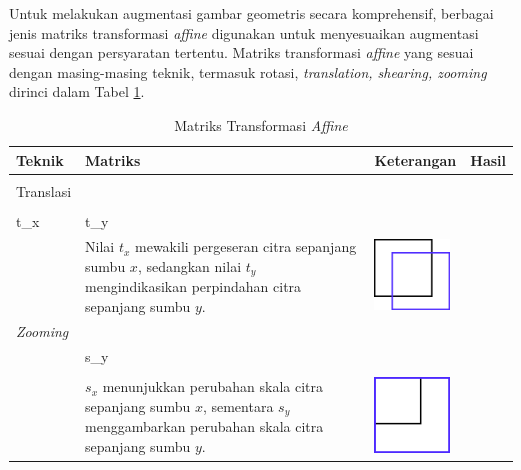    
        

        Untuk melakukan augmentasi gambar geometris secara komprehensif, berbagai jenis matriks transformasi \textit{affine} digunakan untuk menyesuaikan augmentasi sesuai dengan persyaratan tertentu. Matriks transformasi \textit{affine} yang sesuai dengan masing-masing teknik, termasuk rotasi, \textit{translation, shearing, zooming} dirinci dalam Tabel  \ref{Matriks Transformasi Afin pada Operasi Lainnya}.
\begin{table}[H]
    \centering
    \caption{Matriks Transformasi \textit{Affine}}
    \label{Matriks Transformasi Afin pada Operasi Lainnya}
    \scriptsize
    \begin{tabular}{
        >{\raggedright\arraybackslash}m{1.0cm} 
        >{\centering\arraybackslash}m{2.5cm} 
        >{\raggedright\arraybackslash}m{5.0cm}  
        >{\centering\arraybackslash}m{3.0cm}}
        \hline
        \textbf{Teknik} & \textbf{Matriks} & \textbf{Keterangan} & \textbf{Hasil} \\
        \hline \\
        Translasi & 
        \(\begin{bmatrix}
            1 & 0 & 0 \\
            0 & 1 & 0 \\
            t_x & t_y & 1 \\
        \end{bmatrix}\)
        
        & 
        
        Nilai $t_x$ mewakili pergeseran citra sepanjang sumbu $x$, sedangkan nilai $t_y$ mengindikasikan perpindahan citra sepanjang sumbu $y$.
        
        &
        
     \includegraphics[width=2.0cm, height=2.0cm, keepaspectratio]{figures/bab2/translasi} \\
        
        \textit{Zooming}
        
        & 
        
        \(\begin{bmatrix}
            s_x & 0 & 0 \\
            0 & s_y & 0 \\
            0 & 0 & 1 \\
        \end{bmatrix}\) &
        $s_x$ menunjukkan perubahan skala citra sepanjang sumbu $x$, sementara $s_y$ menggambarkan perubahan skala citra sepanjang sumbu $y$. &
        \includegraphics[width=2.0cm, height=2.0cm, keepaspectratio]{figures/bab2/zoom.png} \\
        

\end{tabular}
\end{table}
